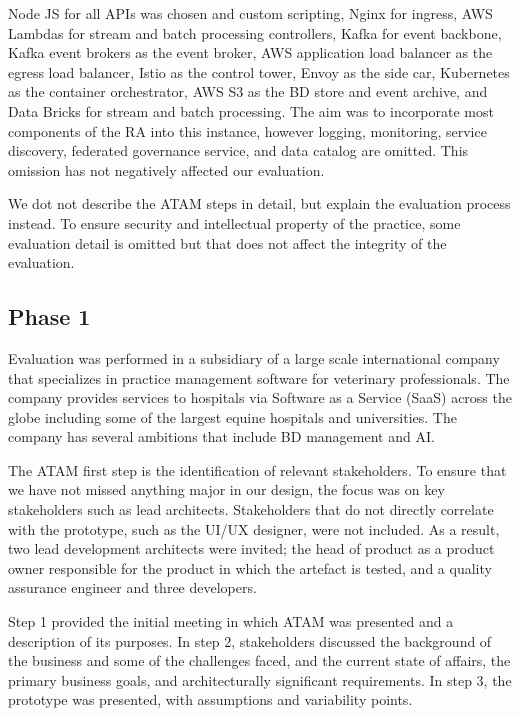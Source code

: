 \documentclass[a4paper,11pt]{article}
\begin{document}

Node JS for all APIs was chosen and custom scripting, Nginx for ingress, AWS Lambdas for stream and batch processing controllers, Kafka for event backbone, Kafka event brokers as the event broker, AWS application load balancer as the egress load balancer, Istio as the control tower, Envoy as the side car, Kubernetes as the container orchestrator, AWS S3 as the BD store and event archive, and Data Bricks for stream and batch processing. The aim was to incorporate most components of the RA into this instance, however logging, monitoring, service discovery, federated governance service, and data catalog are omitted. This omission has not negatively affected our evaluation.

We dot not describe the ATAM steps in detail, but explain the evaluation process instead. To ensure security and intellectual property of the practice, some evaluation detail is omitted but that does not affect the integrity of the evaluation.  

\subsection{Phase 1}
\nobreak{}
Evaluation was performed in a subsidiary of a large scale international company that specializes in practice management software for veterinary professionals. The company provides services to hospitals via Software as a Service (SaaS) across the globe including some of the largest equine hospitals and universities. The company has several ambitions that include BD management and AI. 

The ATAM first step is the identification of relevant stakeholders. To ensure that we have not missed anything major in our design, the focus was on key stakeholders such as lead architects. Stakeholders that do not directly correlate with the prototype, such as the UI/UX designer, were not included. As a result, two lead development architects were invited; the head of product as a product owner responsible for the product in which the artefact is tested, and a quality assurance engineer and three developers. 

Step 1 provided the initial meeting in which ATAM was presented and a description of its purposes. In step 2, stakeholders discussed the background of the business and some of the challenges faced, and the current state of affairs, the primary business goals, and architecturally significant requirements. In step 3, the prototype was presented, with assumptions and variability points. 
\end{document}
